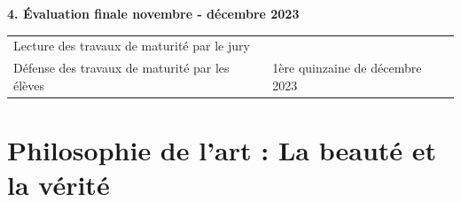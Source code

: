 \documentclass[
  10pt,
  french,
  a5paper,
  openany]{book}
\begin{document}

\textbf{4. Évaluation finale \hfill novembre - décembre 2023}

\begin{longtable}[]{@{}ll@{}}
\toprule
\endhead
\begin{minipage}[t]{0.56\columnwidth}\raggedright
Lecture des travaux de maturité par le jury\strut
\end{minipage} & \begin{minipage}[t]{0.38\columnwidth}\raggedright
\strut
\end{minipage}\tabularnewline
\begin{minipage}[t]{0.56\columnwidth}\raggedright
Défense des travaux de maturité par les élèves\strut
\end{minipage} & \begin{minipage}[t]{0.38\columnwidth}\raggedright
1ère quinzaine de décembre 2023\strut
\end{minipage}\tabularnewline
\bottomrule
\end{longtable}


\renewcommand{\chaptermark}[1]{\markboth{\footnotesize\space#1}{}}
\pagestyle{themes}

\hypertarget{philosophie-de-lart-la-beautuxe9-et-la-vuxe9rituxe9}{%
\chapter{Philosophie de l'art : La beauté et la vérité}\label{philosophie-de-lart-la-beautuxe9-et-la-vuxe9rituxe9}}
\end{document}
